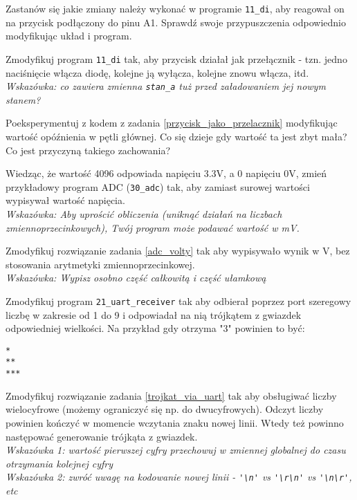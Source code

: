 \dbEntryCheckResults
  Zastanów się jakie zmiany należy wykonać w programie \Verb$11_di$, aby reagował on na przycisk podłączony do pinu A1.
  Sprawdź swoje przypuszczenia odpowiednio modyfikując układ i program.
\fi

\dbEntryCheckResults
  Zmodyfikuj program \Verb$11_di$ tak, aby przycisk działał jak przełącznik - tzn. jedno naciśnięcie włącza diodę, kolejne ją wyłącza, kolejne znowu włącza, itd.\\
  \textit{Wskazówka: co zawiera zmienna \texttt{\Verb$stan_a$} tuż przed załadowaniem jej nowym stanem?}
\fi

\dbEntryCheckResults
  Poeksperymentuj z kodem z zadania \ref{przycisk_jako_przelacznik} modyfikując wartość opóźnienia w pętli głównej. Co się dzieje gdy wartość ta jest zbyt mała? Co jest przyczyną takiego zachowania?
\fi

\dbEntryCheckResults
Wiedząc, że wartość 4096 odpowiada napięciu 3.3V, a 0 napięciu 0V, zmień przykładowy program ADC (\Verb$30_adc$) tak, aby zamiast surowej wartości wypisywał wartość napięcia.\\
\textit{Wskazówka: Aby uprościć obliczenia (uniknąć działań na liczbach zmiennoprzecinkowych), Twój program może podawać wartość w mV.}
\fi

\dbEntryCheckResults
Zmodyfikuj rozwiązanie zadania \ref{adc_volty} tak aby wypisywało wynik w V, bez stosowania arytmetyki zmiennoprzecinkowej.\\
\textit{Wskazówka: Wypisz osobno część całkowitą i część ułamkową}
\fi

\dbEntryCheckResults
Zmodyfikuj program \Verb$21_uart_receiver$ tak aby odbierał poprzez port szeregowy liczbę w zakresie od 1 do 9 i odpowiadał na nią trójkątem z gwiazdek odpowiedniej wielkości.
Na przykład gdy otrzyma "3" powinien to być:
\begin{Verbatim}
*
**
***
\end{Verbatim}
\fi

\dbEntryCheckResults
Zmodyfikuj rozwiązanie zadania \ref{trojkat_via_uart} tak aby obsługiwać liczby wielocyfrowe (możemy ograniczyć się np. do dwucyfrowych).
Odczyt liczby powinien kończyć w momencie wczytania znaku nowej linii. Wtedy też powinno następować generowanie trójkąta z gwiazdek.\\
\textit{Wskazówka 1: wartość pierwszej cyfry przechowuj w zmiennej globalnej do czasu otrzymania kolejnej cyfry} \\
\textit{Wskazówka 2: zwróć uwagę na kodowanie nowej linii - \Verb$'\n'$ vs \Verb$'\r\n'$ vs \Verb$'\n\r'$, etc}
\fi


